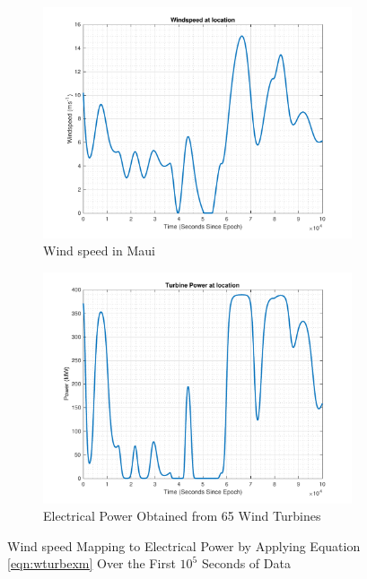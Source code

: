 \begin{figure}[t]
\centering
\begin{subfigure}{.5\textwidth}
  \centering
  \includegraphics[scale=0.4]{./images/AWindspeed-eps-converted-to.pdf}
  \caption{Wind speed in Maui}
  \label{fig:windspeed}
\end{subfigure}%
\begin{subfigure}{.5\textwidth}
  \centering
  \includegraphics[scale=0.4]{./images/AWindpower-eps-converted-to.pdf}
  \caption{Electrical Power Obtained from 65 Wind Turbines}
  \label{fig:windpower}
\end{subfigure}
        \caption{Wind speed Mapping to Electrical Power by Applying Equation \ref{eqn:wturbexm} Over the First $10^5$ Seconds of Data}
\label{fig:speedpowermap}
\end{figure}




